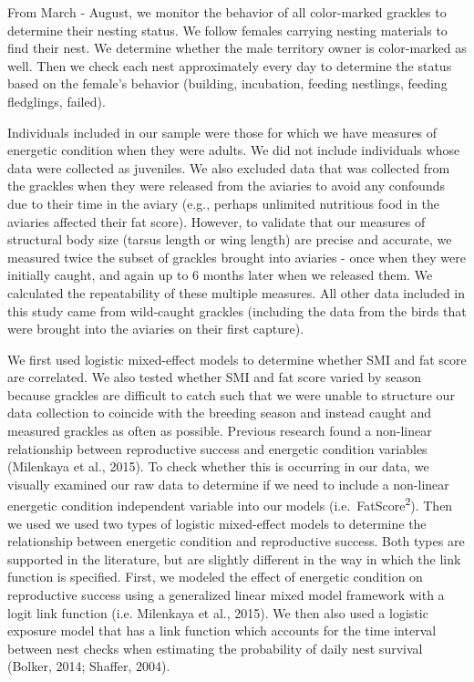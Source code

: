 \documentclass[
]{article}
\begin{document}
From March - August, we monitor the behavior of all color-marked
grackles to determine their nesting status. We follow females carrying
nesting materials to find their nest. We determine whether the male
territory owner is color-marked as well. Then we check each nest
approximately every day to determine the status based on the female's
behavior (building, incubation, feeding nestlings, feeding fledglings,
failed).

Individuals included in our sample were those for which we have measures
of energetic condition when they were adults. We did not include
individuals whose data were collected as juveniles. We also excluded
data that was collected from the grackles when they were released from
the aviaries to avoid any confounds due to their time in the aviary
(e.g., perhaps unlimited nutritious food in the aviaries affected their
fat score). However, to validate that our measures of structural body
size (tarsus length or wing length) are precise and accurate, we
measured twice the subset of grackles brought into aviaries - once when
they were initially caught, and again up to 6 months later when we
released them. We calculated the repeatability of these multiple
measures. All other data included in this study came from wild-caught
grackles (including the data from the birds that were brought into the
aviaries on their first capture).

We first used logistic mixed-effect models to determine whether SMI and
fat score are correlated. We also tested whether SMI and fat score
varied by season because grackles are difficult to catch such that we
were unable to structure our data collection to coincide with the
breeding season and instead caught and measured grackles as often as
possible. Previous research found a non-linear relationship between
reproductive success and energetic condition variables (Milenkaya et
al., 2015). To check whether this is occurring in our data, we visually
examined our raw data to determine if we need to include a non-linear
energetic condition independent variable into our models
(i.e.~FatScore\textsuperscript{2}). Then we used we used two types of
logistic mixed-effect models to determine the relationship between
energetic condition and reproductive success. Both types are supported
in the literature, but are slightly different in the way in which the
link function is specified. First, we modeled the effect of energetic
condition on reproductive success using a generalized linear mixed model
framework with a logit link function (i.e. Milenkaya et al., 2015). We
then also used a logistic exposure model that has a link function which
accounts for the time interval between nest checks when estimating the
probability of daily nest survival (Bolker, 2014; Shaffer, 2004).
\end{document}
